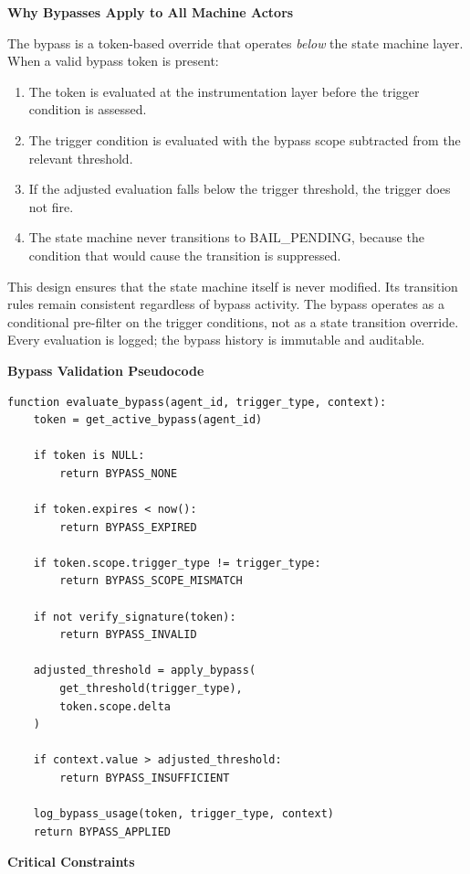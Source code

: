 \bigskip
\noindent\textbf{Why Bypasses Apply to All Machine Actors}

The bypass is a token-based override that operates \textit{below} the state machine layer. When a valid bypass token is present:

\begin{enumerate}
  \item The token is evaluated at the instrumentation layer before the trigger condition is assessed.
  \item The trigger condition is evaluated with the bypass scope subtracted from the relevant threshold.
  \item If the adjusted evaluation falls below the trigger threshold, the trigger does not fire.
  \item The state machine never transitions to BAIL\_PENDING, because the condition that would cause the transition is suppressed.
\end{enumerate}

This design ensures that the state machine itself is never modified. Its transition rules remain consistent regardless of bypass activity. The bypass operates as a conditional pre-filter on the trigger conditions, not as a state transition override. Every evaluation is logged; the bypass history is immutable and auditable.

\bigskip
\noindent\textbf{Bypass Validation Pseudocode}

\begin{verbatim}
function evaluate_bypass(agent_id, trigger_type, context):
    token = get_active_bypass(agent_id)

    if token is NULL:
        return BYPASS_NONE

    if token.expires < now():
        return BYPASS_EXPIRED

    if token.scope.trigger_type != trigger_type:
        return BYPASS_SCOPE_MISMATCH

    if not verify_signature(token):
        return BYPASS_INVALID

    adjusted_threshold = apply_bypass(
        get_threshold(trigger_type),
        token.scope.delta
    )

    if context.value > adjusted_threshold:
        return BYPASS_INSUFFICIENT

    log_bypass_usage(token, trigger_type, context)
    return BYPASS_APPLIED
\end{verbatim}

\bigskip
\noindent\textbf{Critical Constraints}

